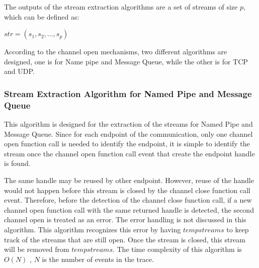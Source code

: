 The outputs of the stream extraction algorithms are a set of streams of size $p$, which can be defined as:

$str = (s_1, s_2, ..., s_p)$

According to the channel open mechanisms, two different algorithms are designed, one is for Name pipe and Message Queue, while the other is for TCP and UDP. 

\subsubsection{Stream Extraction Algorithm for Named Pipe and Message Queue}
This algorithm is designed for the extraction of the streams for Named Pipe and Message Queue. Since for each endpoint of the communication, only one channel open function call is needed to identify the endpoint, it is simple to identify the stream once the channel open function call event that create the endpoint handle is found. 

The same handle may be reused by other endpoint. However, reuse of the handle would not happen before this stream is closed by the channel close function call event. Therefore, before the detection of the channel close function call, if a new channel open function call with the same returned handle is detected, the second channel open is treated as an error. The error handling is not discussed in this algorithm. This algorithm recognizes this error by having $tempstreams$ to keep track of the streams that are still open. Once the stream is closed, this stream will be removed from $tempstreams$. The time complexity of this algorithm is $O(N)$ , $N$ is the number of events in the trace.

